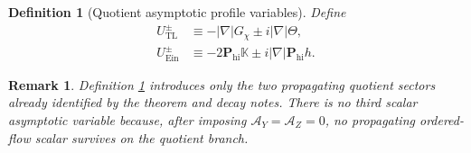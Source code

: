 \documentclass[11pt]{article}
\newcommand{\AY}{\mathcal A_Y}
\newcommand{\AZ}{\mathcal A_Z}
\newtheorem{definition}{Definition}
\newtheorem{remark}{Remark}
\begin{document}
\begin{definition}[Quotient asymptotic profile variables]
\label{def:profiles}
Define
\begin{align}
U_{\mathrm{TL}}^\pm
&\equiv
-|\nabla|G_\chi \pm i|\nabla|\Theta,
\label{eq:UTL}
\\
U_{\mathrm{Ein}}^\pm
&\equiv
-2\mathbf P_{\mathrm{hi}}\mathbb K
\pm i|\nabla|\mathbf P_{\mathrm{hi}}h.
\label{eq:UEin}
\end{align}
\end{definition}

\begin{remark}
Definition \ref{def:profiles} introduces only the two propagating quotient sectors already identified by the theorem and decay notes. There is no third scalar asymptotic variable because, after imposing \(\AY=\AZ=0\), no propagating ordered-flow scalar survives on the quotient branch.
\end{remark}
\end{document}
